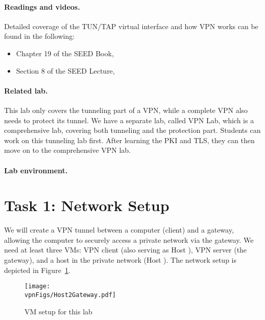 \paragraph{Readings and videos.}
Detailed coverage of the TUN/TAP virtual interface and how 
VPN works can be found in the following:

\begin{itemize}
\item Chapter 19 of the SEED Book, \seedbook
\item Section 8 of the SEED Lecture, \seedisvideo
\end{itemize}


\paragraph{Related lab.}
This lab only covers the tunneling part of a VPN, while 
a complete VPN also needs to protect its tunnel. 
We have a separate lab, called VPN Lab, which
is a comprehensive lab, covering both tunneling and 
the protection part. Students can work on this tunneling
lab first. After learning the PKI and TLS, 
they can then move on to the comprehensive VPN lab.


\paragraph{Lab environment.} \seedenvironment




\newpage
\section{Task 1: Network Setup }


We will create a VPN tunnel between a 
computer (client) and a gateway, allowing the computer to securely access 
a private network via the gateway. 
We need at least three VMs: VPN client (also serving as Host \hostu), VPN server (the gateway),
and a host in the private network (Host \hostv). 
The network setup is depicted in Figure~\ref{vpn:fig:host2gateway}.


\begin{figure}[htb]
\begin{center}
\texttt{[image: \\vpnFigs/Host2Gateway.pdf]}
\end{center}
\caption{VM setup for this lab}
\label{vpn:fig:host2gateway}
\end{figure}
 


